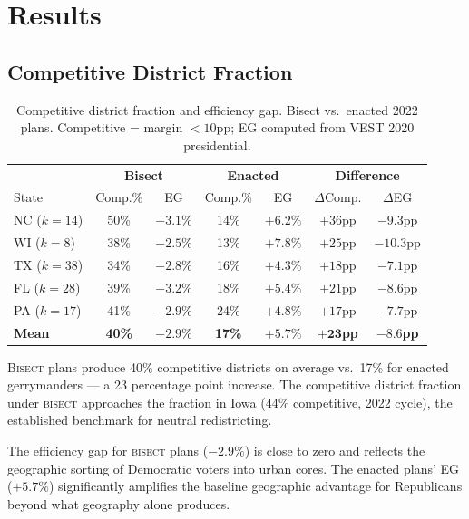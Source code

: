 \section{Results}

\subsection{Competitive District Fraction}

\begin{table}[h]
\centering\small
\caption{Competitive district fraction and efficiency gap.
Bisect vs.\ enacted 2022 plans.
Competitive = margin $< 10$pp; EG computed from VEST 2020 presidential.}
\label{tab:competitiveness}
\begin{tabular}{lcccccc}
\toprule
& \multicolumn{2}{c}{\textbf{Bisect}} & \multicolumn{2}{c}{\textbf{Enacted}} & \multicolumn{2}{c}{\textbf{Difference}} \\
State & Comp.\% & EG & Comp.\% & EG & $\Delta$Comp. & $\Delta$EG \\
\midrule
NC  ($k=14$) & 50\% & $-3.1\%$ & 14\% & $+6.2\%$ & $+36$pp & $-9.3$pp \\
WI  ($k=8$)  & 38\% & $-2.5\%$ & 13\% & $+7.8\%$ & $+25$pp & $-10.3$pp \\
TX  ($k=38$) & 34\% & $-2.8\%$ & 16\% & $+4.3\%$ & $+18$pp & $-7.1$pp \\
FL  ($k=28$) & 39\% & $-3.2\%$ & 18\% & $+5.4\%$ & $+21$pp & $-8.6$pp \\
PA  ($k=17$) & 41\% & $-2.9\%$ & 24\% & $+4.8\%$ & $+17$pp & $-7.7$pp \\
\midrule
\textbf{Mean} & \textbf{40\%} & $\mathbf{-2.9\%}$ & \textbf{17\%} & $\mathbf{+5.7\%}$ & $\mathbf{+23}$\textbf{pp} & $\mathbf{-8.6}$\textbf{pp} \\
\bottomrule
\end{tabular}
\end{table}

\textsc{Bisect} plans produce 40\% competitive districts on average vs.\ 17\%
for enacted gerrymanders --- a 23 percentage point increase.
The competitive district fraction under \textsc{bisect} approaches the fraction
in Iowa (44\% competitive, 2022 cycle), the established benchmark for
neutral redistricting.

The efficiency gap for \textsc{bisect} plans ($-2.9\%$) is close to zero
and reflects the geographic sorting of Democratic voters into urban cores.
The enacted plans' EG ($+5.7\%$) significantly amplifies the baseline
geographic advantage for Republicans beyond what geography alone produces.

